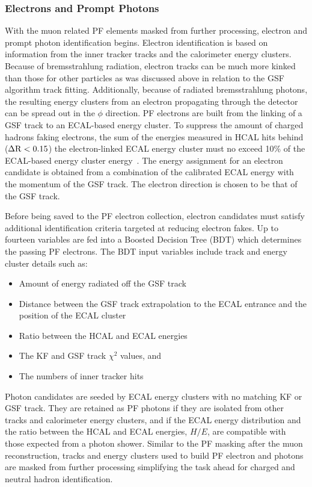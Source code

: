 \subsubsection{Electrons and Prompt Photons}
\label{sec:pf_egamma}
With the muon related PF elements masked from further processing, electron and prompt photon
identification begins.
Electron identification is based on information from the inner tracker tracks and the calorimeter
energy clusters. Because of bremsstrahlung radiation, electron tracks can be much more kinked
than those for other particles as was discussed above in relation to the GSF algorithm track
fitting. Additionally, because of radiated bremsstrahlung photons, the resulting energy clusters 
from an electron propagating through the detector can be spread out in the
$\phi$ direction. PF electrons are built from the linking of a GSF track to an
ECAL-based energy cluster. To suppress the amount of charged hadrons faking electrons, the 
sum of the energies measured in HCAL hits behind ($\Delta \mathrm{R} < 0.15$) 
the electron-linked ECAL energy cluster must no exceed 10\% of the ECAL-based 
energy cluster energy~\cite{Sirunyan:2017ulk}. The energy assignment for an electron candidate is obtained from a 
combination of the calibrated ECAL energy with the momentum of the GSF track. The electron 
direction is chosen to be that of the GSF track.

Before being saved to the PF electron collection, electron candidates must satisfy additional
identification criteria targeted at reducing electron fakes. Up to fourteen variables are
fed into a Boosted Decision Tree (BDT) which determines the passing PF electrons. The BDT
input variables include track and energy cluster details such as:
\begin{itemize}
\item Amount of energy radiated off the GSF track
\item Distance between the GSF track extrapolation to the ECAL entrance and the position of the ECAL cluster
\item Ratio between the HCAL and ECAL energies
\item The KF and GSF track $\chi^2$ values, and
\item The numbers of inner tracker hits
\end{itemize}

Photon candidates are seeded by ECAL energy clusters with no matching KF or GSF track.
They are retained as PF photons if they are isolated from other tracks and calorimeter energy clusters, 
and if the ECAL energy distribution and the ratio between the HCAL and ECAL energies, $H/E$, are 
compatible with those expected from a photon shower. Similar to the PF masking after the muon 
reconstruction, tracks and energy clusters used to
build PF electron and photons are masked from further processing simplifying the task ahead
for charged and neutral hadron identification.

